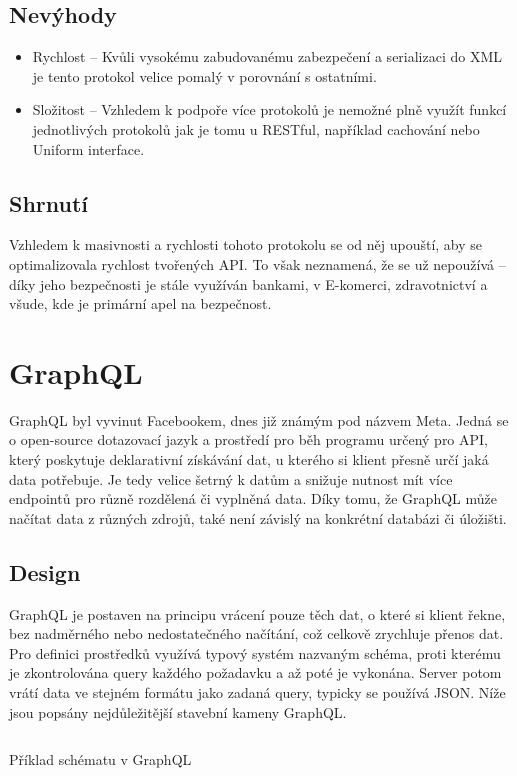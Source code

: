 \subsection{Nevýhody}
\begin{itemize}
    \item Rychlost -- Kvůli vysokému zabudovanému zabezpečení a serializaci do XML je tento protokol velice pomalý v porovnání s ostatními.
    \item Složitost -- Vzhledem k podpoře více protokolů je nemožné plně využít funkcí jednotlivých protokolů jak je tomu u RESTful, například cachování nebo Uniform interface.
\end{itemize}


\subsection{Shrnutí}
Vzhledem k masivnosti a rychlosti tohoto protokolu se od něj upouští, aby se optimalizovala rychlost tvořených API. To však neznamená, že se už nepoužívá -- díky jeho bezpečnosti je stále využíván bankami, v E-komerci, zdravotnictví a všude, kde je primární apel na bezpečnost.


\section{GraphQL}
GraphQL byl vyvinut Facebookem, dnes již známým pod názvem Meta. Jedná se o open-source dotazovací jazyk a prostředí pro běh programu určený pro API, který poskytuje deklarativní získávání dat, u kterého si klient přesně určí jaká data potřebuje. Je tedy velice šetrný k datům a snižuje nutnost mít více endpointů pro různě rozdělená či vyplněná data. Díky tomu, že GraphQL může načítat data z různých zdrojů, také není závislý na konkrétní databázi či úložišti.


\subsection{Design}
GraphQL je postaven na principu vrácení pouze těch dat, o které si klient řekne, bez nadměrného nebo nedostatečného načítání, což celkově zrychluje přenos dat. Pro definici prostředků využívá typový systém nazvaným schéma, proti kterému je zkontrolována query každého požadavku a až poté je vykonána. Server potom vrátí data ve stejném formátu jako zadaná query, typicky se používá JSON. Níže jsou popsány nejdůležitější stavební kameny GraphQL.

\begin{listing}[ht!]
    \inputminted[]{ts}{resources/code/standards/playertype.gql}
    \caption{Příklad schématu v GraphQL}
    \label{code:gql_type}
\end{listing}

